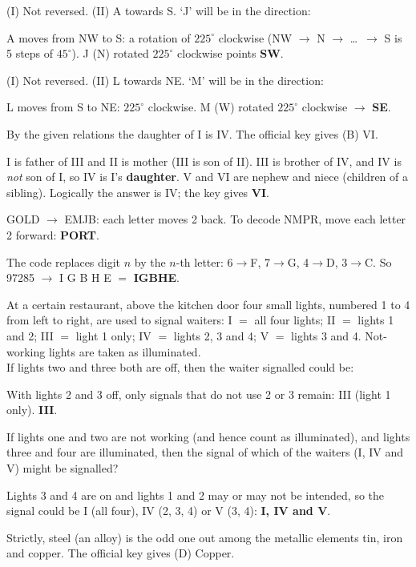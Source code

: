 (I) Not reversed. (II) A towards S. `J' will be in the direction:

A moves from NW to S: a rotation of $225^\circ$ clockwise (NW $\rightarrow$ N $\rightarrow$ \ldots\ $\rightarrow$ S is 5 steps of $45^\circ$). J (N) rotated $225^\circ$ clockwise points \textbf{SW}.

(I) Not reversed. (II) L towards NE. `M' will be in the direction:

L moves from S to NE: $225^\circ$ clockwise. M (W) rotated $225^\circ$ clockwise $\rightarrow$ \textbf{SE}.

By the given relations the daughter of I is IV. The official key gives (B) VI.

I is father of III and II is mother (III is son of II). III is brother of IV, and IV is \emph{not} son of I, so IV is I's \textbf{daughter}. V and VI are nephew and niece (children of a sibling). Logically the answer is IV; the key gives \textbf{VI}.

GOLD $\rightarrow$ EMJB: each letter moves 2 back. To decode NMPR, move each letter 2 forward: \textbf{PORT}.

The code replaces digit $n$ by the $n$-th letter: 6$\rightarrow$F, 7$\rightarrow$G, 4$\rightarrow$D, 3$\rightarrow$C. So 97285 $\rightarrow$ I G B H E $=$ \textbf{IGBHE}.

At a certain restaurant, above the kitchen door four small lights, numbered 1 to 4 from left to right, are used to signal waiters: I $=$ all four lights; II $=$ lights 1 and 2; III $=$ light 1 only; IV $=$ lights 2, 3 and 4; V $=$ lights 3 and 4. Not-working lights are taken as illuminated.\\ If lights two and three both are off, then the waiter signalled could be:

With lights 2 and 3 off, only signals that do not use 2 or 3 remain: III (light 1 only). \textbf{III}.

If lights one and two are not working (and hence count as illuminated), and lights three and four are illuminated, then the signal of which of the waiters (I, IV and V) might be signalled?

Lights 3 and 4 are on and lights 1 and 2 may or may not be intended, so the signal could be I (all four), IV (2, 3, 4) or V (3, 4): \textbf{I, IV and V}.

Strictly, steel (an alloy) is the odd one out among the metallic elements tin, iron and copper. The official key gives (D) Copper.

